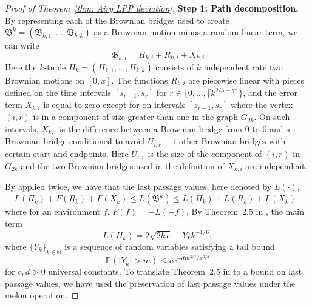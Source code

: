 \documentclass[11pt, reqno]{amsart}
\numberwithin{equation}{section}
\newcommand{\N}{\ensuremath{\mathbb{N}}}
\newcommand{\PP}{\ensuremath{\mathbb{P}}}
\newcommand{\ceil}[1]{\lceil #1 \rceil}
\begin{document}
\begin{proof}[Proof of Theorem~\ref{thm: Airy LPP deviation}]
\medskip

\textbf{Step 1: Path decomposition.} By representing each of the Brownian bridges used to create $\mathfrak{B}^k = (\mathfrak{B}_{k, 1}, \dots, \mathfrak{B}_{k, k})$ as a Brownian motion minus a random linear term, we can write
$$
\mathfrak{B}_{k, i} = H_{k, i} + R_{k, i} + X_{k, i}
$$
Here the $k$-tuple $H_k = (H_{k, 1}, \dots, H_{k, k})$ consists of $k$ independent rate two Brownian motions on $[0, x]$. The functions $R_{k, i}$ are piecewise linear with pieces defined on the time intervals $[s_{r-1}, s_{r}]$ for $r \in \{0, \dots, \ceil{k^{2/3 + \gamma}}\}$, and the error term $X_{k, i}$ is equal to zero except for on intervals $[s_{r-1}, s_{r}]$ where the vertex $(i, r)$ is in a component of size greater than one in the graph $G_{2k}$. On such intervals, $X_{k, i}$ is the difference between a Brownian bridge from $0$ to $0$ and a Brownian bridge conditioned to avoid $U_{i, r} -1$ other Brownian bridges with certain start and endpoints. Here $U_{i, r}$ is the size of the component of $(i, r)$ in $G_{2k}$ and the two Brownian bridges used in the definition of $X_{k, i}$ are independent.

\medskip

By \cite[Lemma 6.9]{DOV} applied twice, we have that the last passage values, here denoted by $L(\cdot)$,
\begin{equation}
\label{eq: subadd}
L(H_k)+F(R_k)+F(X_k) \le L(\mathfrak{B}^k)\le L(H_k)+L(R_k)+L(X_k)\,,
\end{equation}
where for an environment $f$, $F(f) = -L(-f)$.
By Theorem~2.5 in \cite{dauvergne2021}, the main term
\begin{equation}
\label{eq: Wk-2}
L(H_k)=2\sqrt{2kx}+Y_kk^{-1/6},
\end{equation}
where $\{Y_k\}_{k \in \N}$ is a sequence of random variables satisfying a tail bound
$$
\PP(|Y_k| > m) \le c\mathrm{e}^{-dm^{3/2}/x^{3/4}}
$$
for $c, d >0$  universal constants. To translate Theorem~2.5 in \cite{DOV} to a bound on last passage values, we have used the preservation of last passage values under the melon operation.

\medskip


\end{proof}
\end{document}
